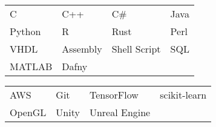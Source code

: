 \documentclass[paper=a4,fontsize=10pt]{resume}
\begin{document}
{		\medskip\normalsize

		\begin{tabular}{llll}
			C & C++ & C\# & Java \\
			Python & R & Rust & Perl \\
			VHDL & Assembly & Shell Script & SQL \\
			MATLAB & Dafny
		\end{tabular}

		\medskip\normalsize

		\begin{tabular}{llll}
			AWS & Git & TensorFlow & scikit-learn \\
			OpenGL & Unity & Unreal Engine
		\end{tabular}
}
\end{document}
